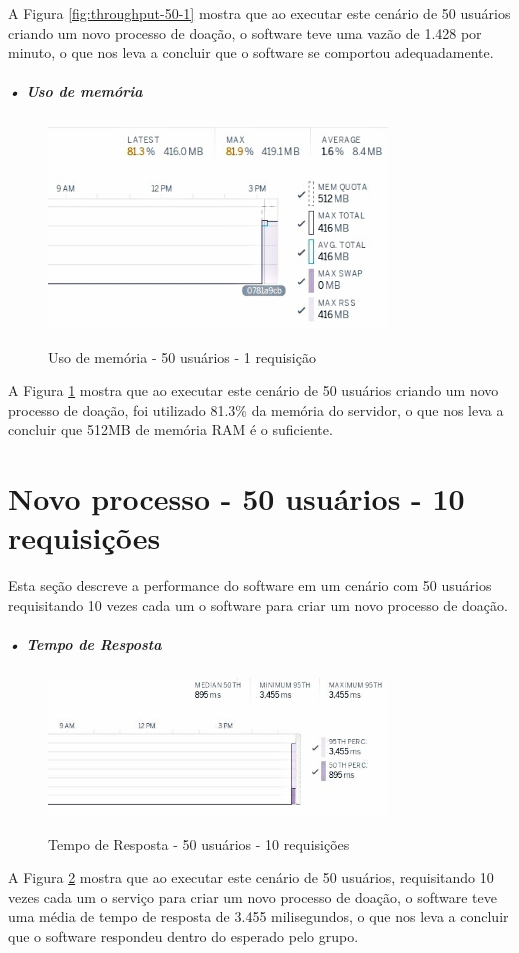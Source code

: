 \documentclass[portuguese,oneside]{tcc}
\begin{document}
A Figura \ref{fig:throughput-50-1} mostra que ao executar este cenário de 50 usuários criando um novo processo de doação, o software teve uma vazão de 1.428 por minuto, o que nos leva a concluir que o software se comportou adequadamente.

\subparagraph{• Uso de memória}
\begin{figure}[htp]
\centering
\caption{Uso de memória - 50 usuários - 1 requisição}
\includegraphics[width=9cm]{50-1-memory}
\label{fig:uso-de-memoria-50-1}
\end{figure}

A Figura \ref{fig:uso-de-memoria-50-1} mostra que ao executar este cenário de 50 usuários criando um novo processo de doação, foi utilizado 81.3\% da memória do servidor, o que nos leva a concluir que 512MB de memória RAM é o suficiente.

\section{Novo processo - 50 usuários - 10 requisições}
Esta seção descreve a performance do software em um cenário com 50 usuários requisitando 10 vezes cada um o software para criar um novo processo de doação.

\subparagraph{• Tempo de Resposta}
\begin{figure}[htp]
\centering
\caption{Tempo de Resposta - 50 usuários - 10 requisições}
\includegraphics[width=9cm]{50-10-response-time}
\label{fig:tempo-reposta-50-10}
\end{figure}
A Figura \ref{fig:tempo-reposta-50-10} mostra que ao executar este cenário de 50 usuários, requisitando 10 vezes cada um o serviço para criar um novo processo de doação, o software teve uma média de tempo de resposta de 3.455 milisegundos, o que nos leva a concluir que o software respondeu dentro do esperado pelo grupo.
\end{document}

